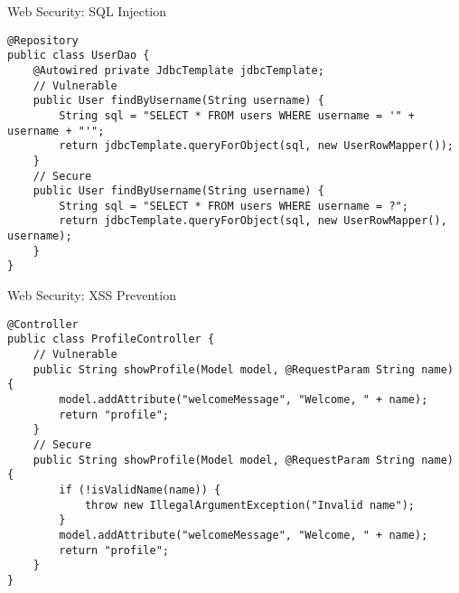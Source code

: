 \documentclass[12pt]{beamer}
\begin{document}
\begin{frame}[fragile]{Web Security: SQL Injection}
  \begin{lstlisting}[style=javastyle]
@Repository
public class UserDao {
    @Autowired private JdbcTemplate jdbcTemplate;
    // Vulnerable
    public User findByUsername(String username) {
        String sql = "SELECT * FROM users WHERE username = '" + username + "'";
        return jdbcTemplate.queryForObject(sql, new UserRowMapper());
    }
    // Secure
    public User findByUsername(String username) {
        String sql = "SELECT * FROM users WHERE username = ?";
        return jdbcTemplate.queryForObject(sql, new UserRowMapper(), username);
    }
}
  \end{lstlisting}
\end{frame}

\begin{frame}[fragile]{Web Security: XSS Prevention}
  \begin{lstlisting}[style=javastyle]
@Controller
public class ProfileController {
    // Vulnerable
    public String showProfile(Model model, @RequestParam String name) {
        model.addAttribute("welcomeMessage", "Welcome, " + name);
        return "profile";
    }
    // Secure
    public String showProfile(Model model, @RequestParam String name) {
        if (!isValidName(name)) {
            throw new IllegalArgumentException("Invalid name");
        }
        model.addAttribute("welcomeMessage", "Welcome, " + name);
        return "profile";
    }
}
  \end{lstlisting}
\end{frame}
\end{document}
